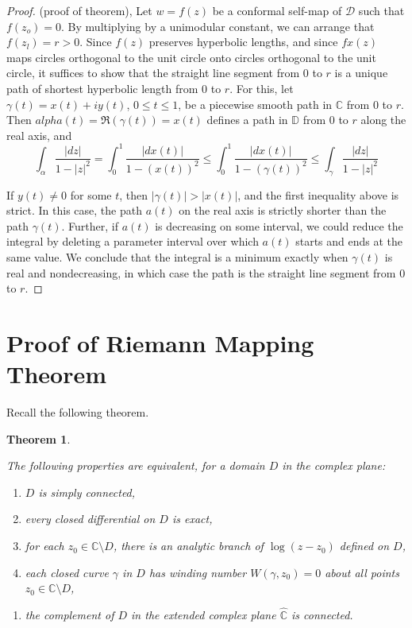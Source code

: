 \documentclass[
]{book}
\providecommand{\tightlist}{%
  \setlength{\itemsep}{0pt}\setlength{\parskip}{0pt}}
\newtheorem{theorem}{Theorem}[chapter]
\theoremstyle{definition}
\theoremstyle{definition}
\theoremstyle{definition}
\theoremstyle{definition}
\theoremstyle{remark}
\begin{document}
\begin{proof}
(proof of theorem), Let \(w = f(z)\) be a conformal self-map of \(\mathcal{D}\)
such that \(f(z_o) = 0\).
By multiplying by a unimodular constant, we can arrange that \(f(z_l) = r > 0\). Since \(f(z)\) preserves hyperbolic lengths, and since \(fx(z)\) maps circles orthogonal to the unit circle onto circles orthogonal to the unit circle, it suffices to show that the straight line segment from 0 to \(r\) is a unique path of shortest hyperbolic length from 0 to \(r\).
For this, let \(\gamma(t) = x(t) + iy(t)\), \(0 \leq t \leq 1\), be a piecewise smooth path in \(\mathbb{C}\) from 0 to \(r\).
Then \(alpha(t) = \Re(\gamma(t)) = x(t)\) defines a path in \(\mathbb{D}\) from 0 to \(r\) along the real axis, and
\[\int_\alpha \frac{|dz|}{1-|z|^2}=\int_0^1\frac{|dx(t)|}{1-(x(t))^2}\leq \int_0^1\frac{|dx(t)|}{1-(\gamma(t))^2}\leq \int_\gamma \frac{|dz|}{1-|z|^2}\]

If \(y(t) \neq 0\) for some \(t\), then \(|\gamma(t)| > |x(t)|\), and the first inequality above is strict. In this case, the path \(a(t)\) on the real axis is strictly shorter than the path \(\gamma(t)\). Further, if \(a(t)\) is decreasing on some interval, we could reduce the integral by deleting a parameter interval over which \(a(t)\) starts and ends at the same value. We conclude that the integral is a minimum exactly when \(\gamma(t)\) is real and nondecreasing, in which case the path is the straight line segment from 0 to \(r\).
\end{proof}

\section{Proof of Riemann Mapping Theorem}\label{proof-of-riemann-mapping-theorem}

Recall the following theorem.

\begin{theorem}
\protect\hypertarget{thm:thm1}{}\label{thm:thm1}

The following properties are equivalent, for a domain \(D\) in the complex plane:

\begin{enumerate}
\def\labelenumi{\roman{enumi}.}
\tightlist
\item
  \(D\) is simply connected,
\item
  every closed differential on \(D\) is exact,
\item
  for each \(z_0 \in \mathbb{C} \setminus D\), there is an analytic branch of \(\log(z - z_0)\) defined
  on \(D\),
\item
  each closed curve \(\gamma\) in \(D\) has winding number \(W(\gamma, z_0) = 0\) about all points \(z_0 \in \mathbb{C} \setminus D\),
\end{enumerate}

\begin{enumerate}
\def\labelenumi{(\alph{enumi})}
\setcounter{enumi}{21}
\tightlist
\item
  the complement of \(D\) in the extended complex plane \(\hat{\mathbb{C}}\) is connected.
\end{enumerate}

\end{theorem}
\end{document}

